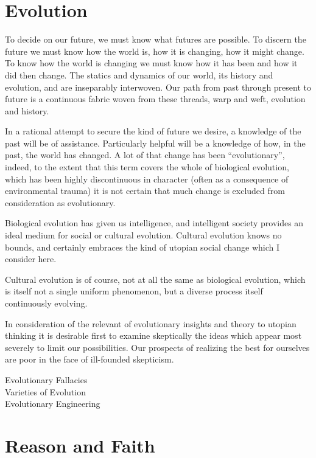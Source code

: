\section{Evolution}

To decide on our future, we must know what futures are possible.
To discern the future we must know how the world is, how it is changing, how it might change.
To know how the world is changing we must know how it has been and how it did then change.
The statics and dynamics of our world, its history and evolution, and are inseparably interwoven.
Our path from past through present to future is a continuous fabric woven from these threads, warp and weft, evolution and history.

In a rational attempt to secure the kind of future we desire, a knowledge of the past will be of assistance.
Particularly helpful will be a knowledge of how, in the past, the world has changed.
A lot of that change has been ``evolutionary'', indeed, to the extent that this term covers the whole of biological evolution, which has been highly discontinuous in character (often as a consequence of environmental trauma) it is not certain that much change is excluded from consideration as evolutionary.

Biological evolution has given us intelligence, and intelligent society provides an ideal medium for social or cultural evolution.
Cultural evolution knows no bounds, and certainly embraces the kind of utopian social change which I consider here.

Cultural evolution is of course, not at all the same as biological evolution, which is itself not a single uniform phenomenon, but a diverse process itself continuously evolving.

In consideration of the relevant of evolutionary insights and theory to utopian thinking it is desirable first to examine skeptically the ideas which appear most severely to limit our possibilities.
Our prospects of realizing the best for ourselves are poor in the face of ill-founded skepticism.

\begin{description}
\item[Evolutionary Fallacies]
\item[Varieties of Evolution]
\item[Evolutionary Engineering] 
\end{description}

\section{Reason and Faith}

